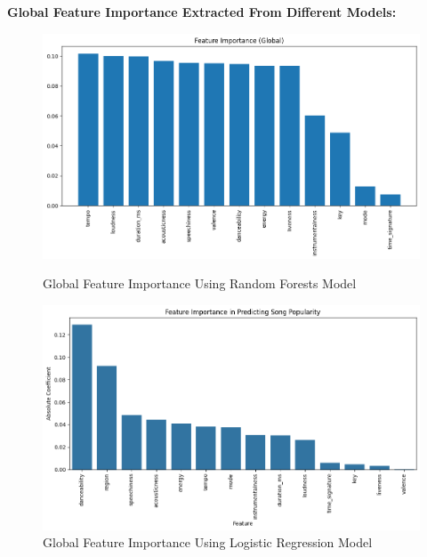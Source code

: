 \newpage
\textbf{Global Feature Importance Extracted From Different Models:}
\begin{figure}[h]
    \centering
    \begin{minipage}{0.45\textwidth}
        \centering
        \includegraphics[width=\linewidth]{media/random_forest_feature_imp_global.png}
        \caption{Global Feature Importance Using Random Forests Model}
    \end{minipage}%
    \hspace{0.05\textwidth} %
    \begin{minipage}{0.45\textwidth}
        \centering
        \includegraphics[width=\linewidth]{media/logistic_reg_feature_imp_global.png}
        \caption{Global Feature Importance Using Logistic Regression Model}
    \end{minipage}
\end{figure}
